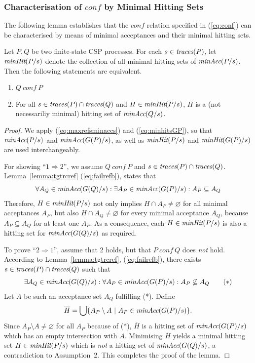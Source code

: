 \subsubsection*{Characterisation of $conf$ by Minimal Hitting Sets}
The following lemma establishes that the $conf$ relation specified in
(\ref{eq:conf}) can be characterised by means of minimal acceptances and
their minimal hitting sets.
%
\begin{lemma}
\label{lemma:hseta}
Let $P, Q$ be two finite-state CSP processes.
For each $s\in\text{\it traces}(P)$,
let $\text{\it minHit}(P/s)$ denote the
collection of all minimal hitting sets of $\text{\it minAcc}(P/s)$.
Then the following statements are equivalent.
\begin{enumerate}
\item $Q\ conf\ P$

\item For all $s\in\text{\it traces}(P)\cap \text{\it traces}(Q)$ and $H \in  \text{\it minHit}(P/s)$, $H$ is
a (not necessariliy minimal) hitting set of $\text{\it minAcc}(Q/s)$.
\end{enumerate}
\end{lemma}
\begin{proof}
We apply (\ref{eq:maxrefsminaccs}) and (\ref{eq:minhitsGP}), so that
$\text{\it minAcc}(P/s)$ and $\text{\it minAcc}(G(P)/s)$, as well as $\text{\it minHit}(P/s)$ and
$\text{\it minHit}(G(P)/s)$ are used interchangeably.

For showing ``$1 \Rightarrow 2$'', we assume $Q\ conf\ P$ and
$s\in\text{\it traces}(P)\cap \text{\it traces}(Q)$. Lemma~\ref{lemma:tgtrcref} (\ref{eq:failrefb}),
states that
\[
\forall A_Q\in\text{\it minAcc}(G(Q)/s):
\exists A_P\in\text{\it minAcc}(G(P)/s): A_P\subseteq A_Q
\]
Therefore, $H \in  \text{\it minHit}(P/s)$ not only implies $H\cap A_P\neq\varnothing$
for all minimal acceptances $A_P$, but also $H\cap A_Q\neq\varnothing$ for
every minimal acceptance $A_Q$, because $A_P\subseteq A_Q$ for at least one
$A_P$. As a consequence, each $H \in \text{\it minHit}(P/s)$ is also a hitting set for
$\text{\it minAcc}(G(Q)/s)$ as required.

To prove ``$2 \Rightarrow 1$'', assume that 2 holds, but that $P\ conf\ Q$
does {\it not} hold. According to Lemma~\ref{lemma:tgtrcref},
(\ref{eq:failrefb}), there exists $s\in\text{\it traces}(P)\cap \text{\it traces}(Q)$ such that
\[
\exists A_Q\in\text{\it minAcc}(G(Q)/s): \forall A_P\in\text{\it minAcc}(G(P)/s): A_P\not\subseteq A_Q
\qquad (*)
\]
Let $A$ be such an acceptance set $A_Q$ fulfilling (*).
Define
\[
\overline H = \bigcup\{ A_P \setminus A~|~A_P\in\text{\it minAcc}(G(P)/s) \}.
\]
Since $A_P \setminus A \neq\varnothing$ for all $A_P$ because of (*),
$\overline H$ is a hitting set of $\text{\it minAcc}(G(P)/s)$ which has an  empty
intersection with $A$. Minimising $\overline H$ yields   a minimal hitting
set $H\in \text{\it minHit}(P/s)$ which is {\it not} a hitting set of
$\text{\it minAcc}(G(Q)/s)$, a contradiction to Assumption~2.
This completes the proof of the lemma.
\xbox
\end{proof}
